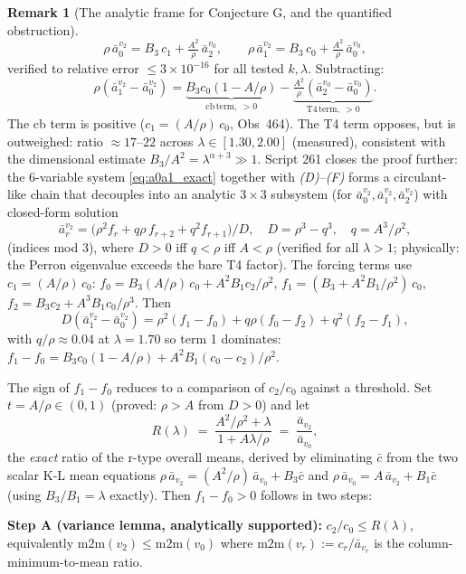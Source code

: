 \documentclass[11pt]{article}
\theoremstyle{definition}
\newtheorem{remark}[theorem]{Remark}
\begin{document}
\begin{remark}[The analytic frame for Conjecture G, and the quantified
obstruction]
\begin{equation}
  \rho\,\bar a_0^{v_2} = B_3\,c_1 + \tfrac{A^2}{\rho}\,\bar a_2^{v_0},
  \qquad
  \rho\,\bar a_1^{v_2} = B_3\,c_0 + \tfrac{A^2}{\rho}\,\bar a_0^{v_0},
\end{equation}
verified to relative error $\le 3\times 10^{-16}$ for all tested $k,\lambda$.
Subtracting:
\[
  \rho(\bar a_1^{v_2} - \bar a_0^{v_2})
  = \underbrace{B_3 c_0(1-A/\rho)}_{\mathrm{cb\,term},\;>0}
  - \underbrace{\tfrac{A^2}{\rho}(\bar a_2^{v_0}-\bar a_0^{v_0})}_{\mathrm{T4\,term},\;>0}.
\]
The cb term is positive ($c_1 = (A/\rho)\,c_0$, Obs~464).
The T4 term opposes, but is outweighed: ratio $\approx 17$--$22$ across
$\lambda\in[1.30,2.00]$ (measured), consistent with the dimensional
estimate $B_3/A^2 = \lambda^{\alpha+3}\gg 1$.
Script 261 closes the proof further: the 6-variable system
\eqref{eq:a0a1_exact} together with \emph{(D)--(F)} forms a circulant-like
chain that decouples into an analytic $3\times 3$ subsystem
(for $\bar a_0^{v_2}, \bar a_1^{v_2}, \bar a_2^{v_2}$) with closed-form solution
\begin{equation}\label{eq:closed_form}
  \bar a_r^{v_2} = \bigl(\rho^2 f_r + q\rho\, f_{r+2} + q^2 f_{r+1}\bigr)/D,
  \quad D = \rho^3 - q^3,\quad q = A^3/\rho^2,
\end{equation}
(indices mod 3), where $D>0$ iff $q < \rho$ iff $A < \rho$
(verified for all $\lambda>1$; physically: the Perron eigenvalue exceeds the bare
T4 factor).
The forcing terms use $c_1 = (A/\rho)\,c_0$:
$f_0 = B_3(A/\rho)\,c_0 + A^2 B_1 c_2/\rho^2$,\;
$f_1 = (B_3 + A^2 B_1/\rho^2)\,c_0$,\;
$f_2 = B_3 c_2 + A^3 B_1 c_0/\rho^3$.
Then
\[
  D(\bar a_1^{v_2} - \bar a_0^{v_2})
  = \rho^2(f_1-f_0) + q\rho(f_0-f_2) + q^2(f_2-f_1),
\]
with $q/\rho \approx 0.04$ at $\lambda=1.70$ so term 1 dominates:
$f_1-f_0 = B_3 c_0(1-A/\rho) + A^2 B_1(c_0-c_2)/\rho^2$.

The sign of $f_1-f_0$ reduces to a comparison of $c_2/c_0$ against a threshold.
Set $t = A/\rho \in (0,1)$ (proved: $\rho > A$ from $D > 0$) and let
\[
  R(\lambda) \;=\; \frac{A^2/\rho^2 + \lambda}{1 + A\lambda/\rho}
  \;=\; \frac{\bar a_{v_2}}{\bar a_{v_0}},
\]
the \emph{exact} ratio of the r-type overall means, derived by eliminating
$\bar c$ from the two scalar K-L mean equations
$\rho\,\bar a_{v_2} = (A^2/\rho)\,\bar a_{v_0} + B_3\bar c$ and
$\rho\,\bar a_{v_0} = A\,\bar a_{v_2} + B_1\bar c$ (using $B_3/B_1 = \lambda$ exactly).
Then $f_1-f_0 > 0$ follows in two steps:

\textbf{Step A (variance lemma, analytically supported):}
$c_2/c_0 \le R(\lambda)$, equivalently $\mathrm{m2m}(v_2) \le \mathrm{m2m}(v_0)$
where $\mathrm{m2m}(v_r) := c_r/\bar a_{v_r}$ is the column-minimum-to-mean ratio.


\end{remark}
\end{document}
